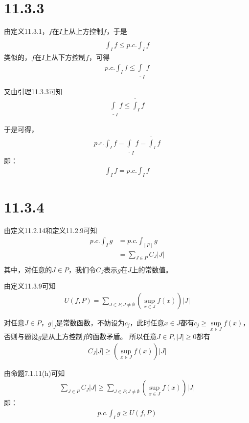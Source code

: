 \documentclass{article}
\begin{document}
\section*{11.3.3}

由定义11.3.1，$f$在$I$上从上方控制$f$，于是
\begin{align*}
  \overline{\int}_{I} f \leq p.c.\int_{I}f
\end{align*}
类似的，$f$在$I$上从下方控制$f$，可得
\begin{align*}
  p.c.\int_{I}f \leq \underline{\int}_I  f
\end{align*}

又由引理11.3.3可知
\begin{align*}
  \underline{\int}_I  f \leq \overline{\int}_{I} f
\end{align*}

于是可得，
\begin{align*}
  p.c.\int_{I}f = \underline{\int}_I  f = \overline{\int}_{I} f
\end{align*}
即：
\begin{align*}
  \int_I  f = p.c.\int_{I}f
\end{align*}

\section*{11.3.4}

由定义11.2.14和定义11.2.9可知
\begin{align*}
  p.c.\int_{I}g & = p.c.\int_{[P]}g               \\
                & = \sum\limits_{J \in P} C_J |J| \\
\end{align*}
其中，对任意的$J \in P$，我们令$C_J$表示$g$在$J$上的常数值。

由定义11.3.9可知
\begin{align*}
  U(f, P) = \sum\limits_{J \in P; J \neq \emptyset} (\sup\limits_{x \in J}f(x)) |J|
\end{align*}

对任意$J \in P$，$g|_J$是常数函数，不妨设为$c_j$，此时任意$x \in J$都有$c_j \geq \sup\limits_{x \in J}f(x)$，
否则与题设$g$是从上方控制$f$的函数矛盾。
所以任意$J \in P, |J| \geq 0$都有
\begin{align*}
  C_J |J| \geq (\sup\limits_{x \in J}f(x)) |J|
\end{align*}

由命题7.1.11(h)可知
\begin{align*}
  \sum\limits_{J \in P} C_J |J| \geq \sum\limits_{J \in P; J \neq \emptyset} (\sup\limits_{x \in J}f(x)) |J|
\end{align*}
即：
\begin{align*}
  p.c.\int_{I}g \geq U(f, P)
\end{align*}
\end{document}
